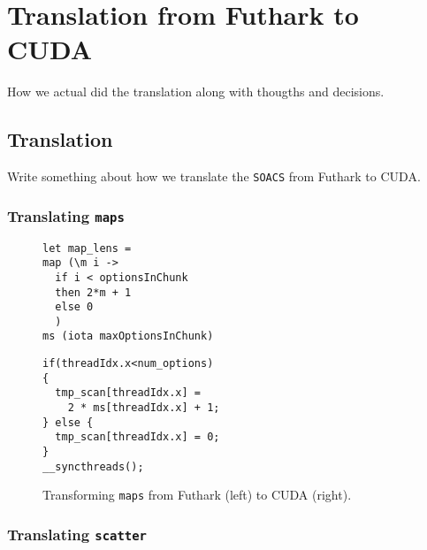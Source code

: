 \section{Translation from Futhark to CUDA}

How we actual did the translation along with thougths and
decisions.


\subsection{Translation}

Write something about how we translate the \texttt{SOACS}
from Futhark to CUDA.

\subsubsection{Translating \texttt{maps}}

%
\begin{figure}[bt]
\begin{center}
\begin{minipage}[t]{0.45\linewidth}
\vspace{0pt}
\begin{lstlisting}
let map_lens =
map (\m i ->
  if i < optionsInChunk
  then 2*m + 1
  else 0
  )
ms (iota maxOptionsInChunk)
\end{lstlisting}
\end{minipage}
\begin{minipage}[t]{0.45\linewidth}
\vspace{0pt}
\begin{lstlisting}
if(threadIdx.x<num_options)
{
  tmp_scan[threadIdx.x] =
    2 * ms[threadIdx.x] + 1;
} else {
  tmp_scan[threadIdx.x] = 0;
}
__syncthreads();
\end{lstlisting}
\end{minipage}
\caption{Transforming \texttt{maps} from Futhark (left) to
  CUDA (right).}
\end{center}
\end{figure}
%

\subsubsection{Translating \texttt{scatter}}

